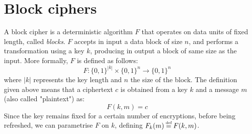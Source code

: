 \documentclass[12pt,a4paper]{book}
\newcommand\defeq{\stackrel{\mathclap{\normalfont\mbox{\tiny def}}}{=}}
\theoremstyle{definition}
\begin{document}

	\section{Block ciphers}\label{sec:block-ciphers}
	A block cipher is a deterministic algorithm $F$ that operates on data units of fixed length, called \textit{blocks}. $F$ accepts in input a data block of size $n$, and performs a transformation using a key $k$, producing in output a block of same size as the input. More formally, $F$ is defined as follows:
	\[
		F: \{0,1\}^{|k|} \times \{0,1\}^n \rightarrow \{0,1\}^n
	\]
	where $|k|$ represents the key length and $n$ the size of the block. The definition given above means that a ciphertext $c$ is obtained from a key $k$ and a message $m$ (also called "plaintext") as:
	\[
		F(k,m) = c
	\]
	Since the key remains fixed for a certain number of encryptions, before being refreshed, we can parametrise $F$ on $k$, defining $F_k(m) \defeq F(k,m)$.
	
\end{document}
